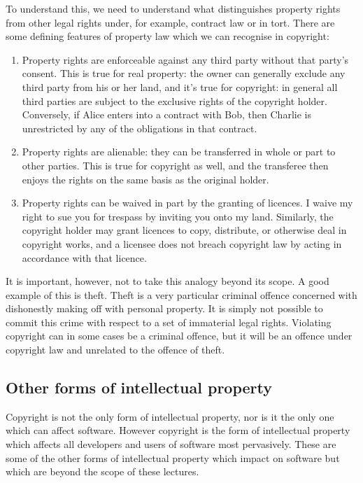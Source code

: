 \documentclass[a4paper,12pt]{article}
\begin{document}
To understand this, we need to understand what distinguishes property rights
from other legal rights under, for example, contract law or in tort. There
are some defining features of property law which we can recognise in
copyright:
\begin{enumerate}
\item Property rights are enforceable against any third party without that
  party's consent. This is true
  for real property: the owner can generally exclude any third party from
  his or her land, and it's true for copyright: in general all third parties
  are subject to the exclusive rights of the copyright holder. Conversely,
  if Alice enters into a contract with Bob, then Charlie is unrestricted by
  any of the obligations in that contract.
\item Property rights are alienable: they can be transferred in whole or
  part to other parties. This is true for copyright as well, and the
  transferee then enjoys the rights on the same basis as the original
  holder.
\item Property rights can be waived in part by the granting of licences. I
  waive my right to sue you for trespass by inviting you onto my
  land. Similarly, the copyright holder may grant licences to copy,
  distribute, or otherwise deal in copyright works, and a licensee does not
  breach copyright law by acting in accordance with that licence.
\end{enumerate}

It is important, however, not to take this analogy beyond its scope. A good
example of this is theft. Theft is a very particular criminal offence
concerned with dishonestly making off with personal property. It is simply
not possible to commit this crime with respect to a set of immaterial legal
rights. Violating copyright can in some cases be a criminal offence, but it
will be an offence under copyright law and
unrelated to the offence of theft. 

\subsection{Other forms of intellectual property}

Copyright is not the only form of intellectual property, nor is it the only
one which can affect software. However copyright is the form of intellectual
property which affects all developers and users of software most
pervasively. These are some of the other forms of intellectual property
which impact on software but which are beyond the scope of these lectures.
\end{document}
